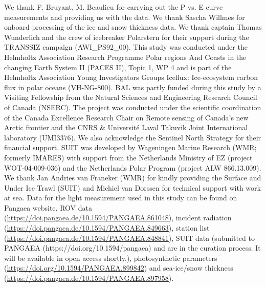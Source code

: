 \documentclass[draft]{agujournal2018}
\begin{document}
We thank F. Bruyant, M. Beaulieu for carrying out the P vs. E curve measurements and providing us with the data. We thank Sascha Willmes for onboard processing of the ice and snow thickness data. We thank captain Thomas Wunderlich and the crew of icebreaker Polarstern for their support during the TRANSSIZ campaign (AWI\_PS92\_00). This study was conducted under the Helmholtz Association Research Programme Polar regions And Coasts in the changing Earth System II (PACES II), Topic 1, WP 4 and is part of the Helmholtz Association Young Investigators Groups Iceflux: Ice-ecosystem carbon flux in polar oceans (VH-NG-800). BAL was partly funded during this study by a Visiting Fellowship from the Natural Sciences and Engineering Research Council of Canada (NSERC). The project was conducted under the scientific coordination of the Canada Excellence Research Chair on Remote sensing of Canada's new Arctic frontier and the CNRS \& Université Laval Takuvik Joint International laboratory (UMI3376). We also acknowledge the Sentinel North Strategy for their financial support. SUIT was developed by Wageningen Marine Research (WMR; formerly IMARES) with support from the Netherlands Ministry of EZ (project WOT-04-009-036) and the Netherlands Polar Program (project ALW 866.13.009). We thank Jan Andries van Franeker (WMR) for kindly providing the Surface and Under Ice Trawl (SUIT) and Michiel van Dorssen for technical support with work at sea. Data for the light measurement used in this study can be found on Pangaea website. ROV data (\url{https://doi.pangaea.de/10.1594/PANGAEA.861048}), incident radiation (\url{https://doi.pangaea.de/10.1594/PANGAEA.849663}), station list (\url{https://doi.pangaea.de/10.1594/PANGAEA.848841}), SUIT data (submitted to PANGAEA (https://doi.org/10.1594/pangaea) and are in the curation process. It will be available in open access shortly.), photosynthetic parameters (\url{https://doi.org/10.1594/PANGAEA.899842}) and sea-ice/snow thickness (\url{https://doi.pangaea.de/10.1594/PANGAEA.897958}).


%

\end{document}
